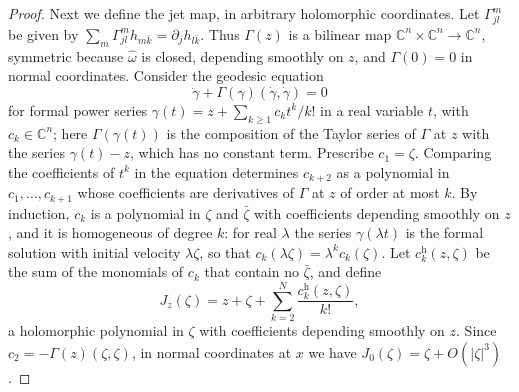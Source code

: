 \begin{proof}
Next we define the jet map, in arbitrary holomorphic coordinates. Let $\Gamma^m_{jl}$ be given by $\sum_m\Gamma^m_{jl}h_{m\bar k}=\partial_jh_{l\bar k}$. Thus $\Gamma(z)$ is a bilinear map $\mathbb C^n\times\mathbb C^n\to\mathbb C^n$, symmetric because $\widehat\omega$ is closed, depending smoothly on $z$, and $\Gamma(0)=0$ in normal coordinates. Consider the geodesic equation
\[
 \ddot\gamma+\Gamma(\gamma)(\dot\gamma,\dot\gamma)=0
\]
for formal power series $\gamma(t)=z+\sum_{k\geq1}c_kt^k/k!$ in a real variable $t$, with $c_k\in\mathbb C^n$; here $\Gamma(\gamma(t))$ is the composition of the Taylor series of $\Gamma$ at $z$ with the series $\gamma(t)-z$, which has no constant term. Prescribe $c_1=\zeta$. Comparing the coefficients of $t^k$ in the equation determines $c_{k+2}$ as a polynomial in $c_1,\ldots,c_{k+1}$ whose coefficients are derivatives of $\Gamma$ at $z$ of order at most $k$. By induction, $c_k$ is a polynomial in $\zeta$ and $\bar\zeta$ with coefficients depending smoothly on $z$, and it is homogeneous of degree $k$: for real $\lambda$ the series $\gamma(\lambda t)$ is the formal solution with initial velocity $\lambda\zeta$, so that $c_k(\lambda\zeta)=\lambda^kc_k(\zeta)$. Let $c_k^{\mathrm h}(z,\zeta)$ be the sum of the monomials of $c_k$ that contain no $\bar\zeta$, and define
\[
 J_z(\zeta)=z+\zeta+\sum_{k=2}^N\frac{c_k^{\mathrm h}(z,\zeta)}{k!},
\]
a holomorphic polynomial in $\zeta$ with coefficients depending smoothly on $z$. Since $c_2=-\Gamma(z)(\zeta,\zeta)$, in normal coordinates at $x$ we have $J_0(\zeta)=\zeta+O(|\zeta|^3)$.


\end{proof}
